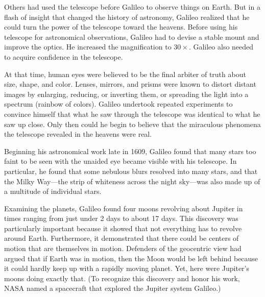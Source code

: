 \documentclass[main.tex]{subfiles}
\begin{document}
\vspace{1em}

Others had used the telescope before Galileo to observe things on Earth. But in a flash of insight that changed the history of astronomy, Galileo realized that he could turn the power of the telescope toward the heavens. Before using his telescope for astronomical observations, Galileo had to devise a stable mount and improve the optics. He increased the magnification to $30\times$. Galileo also needed to acquire confidence in the telescope.

\vspace{1em}

At that time, human eyes were believed to be the final arbiter of truth about size, shape, and color. Lenses, mirrors, and prisms were known to distort distant images by enlarging, reducing, or inverting them, or spreading the light into a spectrum (rainbow of colors). Galileo undertook repeated experiments to convince himself that what he saw through the telescope was identical to what he saw up close. Only then could he begin to believe that the miraculous phenomena the telescope revealed in the heavens were real.

\vspace{1em}

Beginning his astronomical work late in 1609, Galileo found that many stars too faint to be seen with the unaided eye became visible with his telescope. In particular, he found that some nebulous blurs resolved into many stars, and that the Milky Way---the strip of whiteness across the night sky---was also made up of a multitude of individual stars.

\vspace{1em}

Examining the planets, Galileo found four moons revolving about Jupiter in times ranging from just under 2 days to about 17 days. This discovery was particularly important because it showed that not everything has to revolve around Earth. Furthermore, it demonstrated that there could be centers of motion that are themselves in motion. Defenders of the geocentric view had argued that if Earth was in motion, then the Moon would be left behind because it could hardly keep up with a rapidly moving planet. Yet, here were Jupiter's moons doing exactly that. (To recognize this discovery and honor his work, NASA named a spacecraft that explored the Jupiter system Galileo.)

\vspace{1em}
\end{document}
